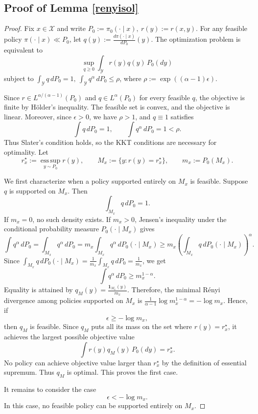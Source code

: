 \documentclass[11pt]{article}
\begin{document}
\subsection{Proof of Lemma \ref{renyisol}}
\begin{proof}
Fix $x\in\mathcal X$ and write $P_0:=\pi_0(\cdot\mid x),~
r(y):=r(x,y)$. For any feasible policy $\pi(\cdot\mid x)\ll P_0$, let
$
q(y):=\frac{d\pi(\cdot\mid x)}{dP_0}(y).
$
The optimization problem is equivalent to
\[
\sup_{q\ge0}
\int_{\mathcal Y} r(y)q(y)\,P_0(dy)
\]
subject to $\int_{\mathcal Y}q\,dP_0=1,~\int_{\mathcal Y}q^\alpha\,dP_0\le \rho$, where
$\rho:=\exp((\alpha-1)\epsilon)$.

Since $r\in L^{\alpha/(\alpha-1)}(P_0)$ and $q\in L^\alpha(P_0)$ for every
feasible $q$, the objective is finite by H\"older's inequality. The feasible
set is convex, and the objective is linear. Moreover, since $\epsilon>0$,
we have $\rho>1$, and $q\equiv1$ satisfies
\[
\int q\,dP_0=1,
\qquad
\int q^\alpha\,dP_0=1<\rho.
\]
Thus Slater's condition holds, so the KKT conditions are necessary for
optimality. Let
\[
r_x^\star:=\operatorname*{ess\,sup}_{y\sim P_0}r(y),
\qquad
M_x:=\{y:r(y)=r_x^\star\},
\qquad
m_x:=P_0(M_x).
\]

We first characterize when a policy supported entirely on $M_x$ is feasible.
Suppose $q$ is supported on $M_x$. Then
\[
\int_{M_x}q\,dP_0=1.
\]
If $m_x=0$, no such density exists. If $m_x>0$, Jensen's inequality under the
conditional probability measure $P_0(\cdot\mid M_x)$ gives
\[
\int q^\alpha\,dP_0
=
\int_{M_x}q^\alpha\,dP_0
=
m_x\int_{M_x}q^\alpha\,dP_0(\cdot\mid M_x)
\ge
m_x
\left(
\int_{M_x}q\,dP_0(\cdot\mid M_x)
\right)^\alpha.
\]
Since $\int_{M_x}q\,dP_0(\cdot\mid M_x)
=
\frac1{m_x}\int_{M_x}q\,dP_0
=
\frac1{m_x}$, we get
\[
\int q^\alpha\,dP_0
\ge
m_x^{1-\alpha}.
\]
Equality is attained by $
q_M(y)=\frac{\mathbf 1_{M_x}(y)}{m_x}$. Therefore, the minimal R\'enyi divergence among policies supported on $M_x$ is $\frac1{\alpha-1}\log m_x^{1-\alpha}
=
-\log m_x$. Hence, if
\[
\epsilon\ge -\log m_x,
\]
then $q_M$ is feasible. Since $q_M$ puts all its mass on the set where
$r(y)=r_x^\star$, it achieves the largest possible objective value
\[
\int r(y)q_M(y)\,P_0(dy)=r_x^\star.
\]
No policy can achieve objective value larger than $r_x^\star$ by the definition
of essential supremum. Thus $q_M$ is optimal. This proves the first case.

It remains to consider the case
\[
\epsilon<-\log m_x.
\]
In this case, no feasible policy can be supported entirely on $M_x$.


\end{proof}
\end{document}
